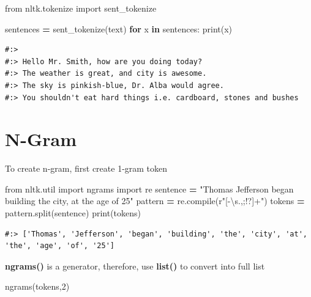 \documentclass[
]{book}
\newenvironment{Shaded}{\begin{snugshade}}{\end{snugshade}}
\newcommand{\BuiltInTok}[1]{#1}
\newcommand{\ControlFlowTok}[1]{\textcolor[rgb]{0.27,0.27,0.27}{\textbf{#1}}}
\newcommand{\DecValTok}[1]{\textcolor[rgb]{0.06,0.06,0.06}{#1}}
\newcommand{\ImportTok}[1]{#1}
\newcommand{\KeywordTok}[1]{\textcolor[rgb]{0.27,0.27,0.27}{\textbf{#1}}}
\newcommand{\NormalTok}[1]{#1}
\newcommand{\OperatorTok}[1]{\textcolor[rgb]{0.43,0.43,0.43}{\textbf{#1}}}
\newcommand{\StringTok}[1]{\textcolor[rgb]{0.5,0.5,0.5}{#1}}
\newcommand{\VerbatimStringTok}[1]{\textcolor[rgb]{0.5,0.5,0.5}{#1}}
\begin{document}
\begin{Shaded}
\begin{Highlighting}[]
\ImportTok{from}\NormalTok{ nltk.tokenize }\ImportTok{import}\NormalTok{ sent_tokenize}

\NormalTok{sentences }\OperatorTok{=}\NormalTok{ sent_tokenize(text)}
\ControlFlowTok{for}\NormalTok{ x }\KeywordTok{in}\NormalTok{ sentences:}
  \BuiltInTok{print}\NormalTok{(x) }
\end{Highlighting}
\end{Shaded}

\begin{verbatim}
#:> 
#:> Hello Mr. Smith, how are you doing today?
#:> The weather is great, and city is awesome.
#:> The sky is pinkish-blue, Dr. Alba would agree.
#:> You shouldn't eat hard things i.e. cardboard, stones and bushes
\end{verbatim}

\hypertarget{n-gram}{%
\section{N-Gram}\label{n-gram}}

To create n-gram, first create 1-gram token

\begin{Shaded}
\begin{Highlighting}[]
\ImportTok{from}\NormalTok{ nltk.util }\ImportTok{import}\NormalTok{ ngrams }
\ImportTok{import}\NormalTok{ re}
\NormalTok{sentence }\OperatorTok{=} \StringTok{"Thomas Jefferson began building the city, at the age of 25"}
\NormalTok{pattern }\OperatorTok{=}\NormalTok{ re.}\BuiltInTok{compile}\NormalTok{(}\VerbatimStringTok{r"[-\textbackslash{}s.,;!?]+"}\NormalTok{)}
\NormalTok{tokens }\OperatorTok{=}\NormalTok{ pattern.split(sentence)}
\BuiltInTok{print}\NormalTok{(tokens)}
\end{Highlighting}
\end{Shaded}

\begin{verbatim}
#:> ['Thomas', 'Jefferson', 'began', 'building', 'the', 'city', 'at', 'the', 'age', 'of', '25']
\end{verbatim}

\textbf{ngrams()} is a generator, therefore, use \textbf{list()} to convert into full list

\begin{Shaded}
\begin{Highlighting}[]
\NormalTok{ngrams(tokens,}\DecValTok{2}\NormalTok{)}
\end{Highlighting}
\end{Shaded}
\end{document}
